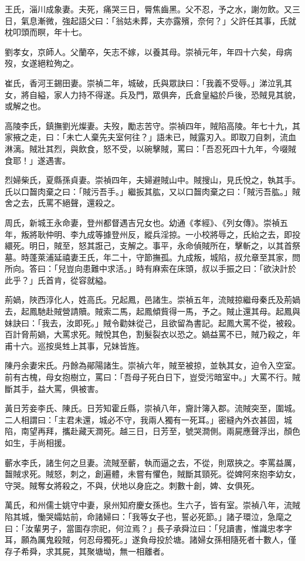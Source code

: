 \begin{pinyinscope}
王氏，淄川成象妻。夫死，痛哭三日，脣焦齒黑。父不忍，予之水，謝勿飲。又三日，氣息漸微，強起語父曰：「翁姑未葬，夫亦露殯，奈何？」父許任其事，氏就枕叩頭而瞑，年十七。

劉孝女，京師人。父蘭卒，矢志不嫁，以養其母。崇禎元年，年四十六矣，母病歿，女遂絕粒殉之。

崔氏，香河王錫田妻。崇禎二年，城破，氏與眾訣曰：「我義不受辱。」涕泣乳其女，將自縊，家人力持不得遂。兵及門，眾俱奔，氏倉皇縊於戶後，恐賊見其貌，或解之也。

高陵李氏，鎮撫劉光燦妻。夫歿，勵志苦守。崇禎四年，賊陷高陵。年七十九，其家掖之走，曰：「未亡人棄先夫室何往？」語未已，賊露刃入。即取刀自刺，流血淋漓。賊壯其烈，與飲食，怒不受，以碗擊賊，罵曰：「吾忍死四十九年，今啜賊食耶！」遂遇害。

烈婦柴氏，夏縣孫貞妻。崇禎四年，夫婦避賊山中。賊搜山，見氏悅之，執其手。氏以口齧肉棄之曰：「賊污吾手。」繼扳其肱，又以口齧肉棄之曰：「賊污吾肱。」賊舍之去，氏罵不絕聲，還殺之。

周氏，新城王永命妻，登州都督遇吉兄女也。幼通《孝經》、《列女傳》。崇禎五年，叛將耿仲明、李九成等據登州反，縱兵淫掠。一小校將辱之，氏紿之去，即投繯死。明日，賊至，怒其誑己，支解之。事平，永命偵賊所在，擊斬之，以其首祭墓。時蓬萊浦延禧妻王氏，年二十，守節撫孤。九成叛，城陷，叔允章至其家，問所向。答曰：「兒豈向患難中求活。」時有麻索在床頭，叔以手振之曰：「欲決計於此乎？」氏首肯，從容就縊。

荊媧，陜西淳化人，姓高氏。兄起鳳，邑諸生。崇禎五年，流賊掠繼母秦氏及荊媧去，起鳳馳赴賊營請贖。賊索二馬，起鳳傾貲得一馬，予之。賊止還其母。起鳳與妹訣曰：「我去，汝即死。」賊令勸妹從己，且欲留為書記。起鳳大罵不從，被殺。百計脅荊媧，大罵求死。賊悅其色，割髮裂衣以恐之。媧益罵不已，賊乃殺之，年甫十六。巡按吳甡上其事，兄妹皆旌。

陳丹余妻宋氏。丹餘為鄖陽諸生。崇禎六年，賊至被掠，並執其女，迫令入空室。前有古槐，母女抱樹立，罵曰：「吾母子死白日下，豈受污暗室中。」大罵不行。賊斷其手，益大罵，俱被害。

黃日芳妾李氏、陳氏。日芳知霍丘縣，崇禎八年，齎計簿入郡。流賊突至，圍城。二人相謂曰：「主君未還，城必不守，我兩人獨有一死耳。」密縫內外衣甚固，城陷，南望再拜，攜赴藏天澗死。越三日，日芳至，號哭澗側。兩屍應聲浮出，顏色如生，手尚相援。

蘄水李氏，諸生何之旦妻。流賊至蘄，執而逼之去，不從，則眾挾之。李罵益厲，齧賊求死。賊怒，刺之，創遍體，未嘗有懼色，賊斷其頸死。從婢阿來抱李幼女，守哭。賊奪女將殺之，不與，伏地以身庇之。刺數十創，婢、女俱死。

萬氏，和州儒士姚守中妻，泉州知府慶女孫也。生六子，皆有室。崇禎八年，流賊陷其城，慟哭孀姑前，命諸婦曰：「我等女子也，誓必死節。」諸子環泣，急麾之曰：「汝輩男子，當圖存宗祀，何泣焉？」長子承舜泣曰：「兒讀書，惟識忠孝字耳，願為厲鬼殺賊，何忍母獨死。」遂負母投於塘。諸婦女孫相隨死者十數人，僅存子希舜，求其屍，其聚塘坳，無一相離者。


\end{pinyinscope}

